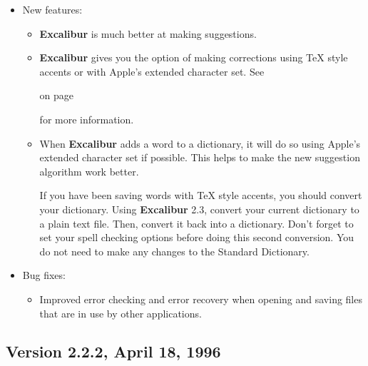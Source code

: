 \documentclass[11pt,titlepage]{article}
\newcommand{\ex}{\textbf{Excalibur}}
\begin{document}
\begin{itemize}
\item New features:
  \begin{itemize}
  \item \ex{} is much better at making suggestions.

  \item \ex{} gives you the option of making corrections using \TeX{}
    style accents or with Apple's extended character set.  See
    \begin{latexonly}
      on page~\pageref{sec:latex-options}
    \end{latexonly}
    for more information.

  \item When \ex{} adds a word to a dictionary, it will do so using
    Apple's extended character set if possible.  This helps to make
    the new suggestion algorithm work better.

    If you have been saving words with \TeX{} style accents, you
    should convert your dictionary.  Using \ex{} 2.3, convert your
    current dictionary to a plain text file.  Then, convert it back
    into a dictionary.  Don't forget to set your spell checking
    options before doing this second conversion.  You do not need to
    make any changes to the Standard Dictionary.

  \end{itemize}

\item Bug fixes:
  \begin{itemize}
  \item Improved error checking and error recovery when opening and
    saving files that are in use by other applications.
  \end{itemize}
\end{itemize}

\subsection{Version 2.2.2, April 18, 1996}
\end{document}
